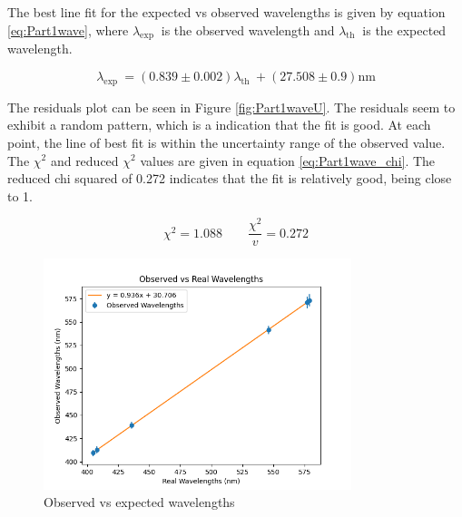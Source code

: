 The best line fit for the expected vs observed wavelengths is given by equation \ref{eq:Part1wave}, where $\lambda_{\text {exp }}$ is the observed wavelength and $\lambda_{\text {th }}$ is the expected wavelength.

\begin{equation}
    \lambda_{\text {exp }} = (0.839 \pm 0.002) \lambda_{\text {th }} + (27.508 \pm 0.9) \text{nm}
    \label{eq:Part1wave}
\end{equation}

The residuals plot can be seen in Figure \ref{fig:Part1waveU}. The residuals seem to exhibit a random pattern, which is a indication that the fit is good. At each point, the line of best fit is within
the uncertainty range of the observed value. The $\chi^2$ and reduced $\chi^2$ values are given in equation \ref{eq:Part1wave_chi}. The reduced chi squared of 0.272 indicates that the fit is relatively good, being close to 1.

\begin{equation}
    \label{eq:Part1wave_chi}
    \chi^2 = 1.088 \qquad
    \frac{\chi^2}{v} = 0.272
\end{equation}

\begin{figure}[H]
    \centering
    \includegraphics[width=0.8\textwidth]{Results/Sections/Part1/Part1_wavelength_observed_vs_expected.png}
    \caption{Observed vs expected wavelengths}
    \label{fig:Part1wave}
\end{figure}


